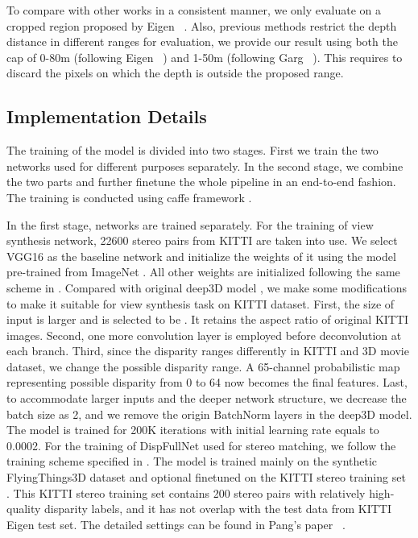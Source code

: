 \documentclass[10pt,twocolumn,letterpaper]{article}
\begin{document}
To compare with other works in a consistent manner, we only evaluate on a cropped region proposed by Eigen \etal~\cite{eigen2014depth}. Also, previous methods restrict the depth distance in different ranges for evaluation, we provide our result using both the cap of 0-80m (following Eigen \etal~\cite{eigen2014depth}) and 1-50m (following Garg \etal~\cite{garg2016unsupervised}). This requires to discard the pixels on which the depth is outside the proposed range. 

\subsection{Implementation Details}
\label{secion:impl_details}
The training of the model is divided into two stages. First we train the two networks used for different purposes separately. In the second stage, we combine the two parts and further finetune the whole pipeline in an end-to-end fashion. The training is conducted using caffe framework \cite{jia14caffe}.

In the first stage, networks are trained separately. For the training of view synthesis network, 22600 stereo pairs from KITTI are taken into use. We select VGG16 as the baseline network and initialize the weights of it using the model pre-trained from ImageNet \cite{Simonyan14c}. All other weights are initialized following the same scheme in \cite{xie2016deep3d}. Compared with original deep3D model \cite{xie2016deep3d}, we make some modifications to make it suitable for view synthesis task on KITTI dataset. First, the size of input is larger and is selected to be . It retains the aspect ratio of original KITTI images. Second, one more convolution layer is employed before deconvolution at each branch. Third, since the disparity ranges differently in KITTI and 3D movie dataset, we change the possible disparity range. A 65-channel probabilistic map representing possible disparity from 0 to 64 now becomes the final features. Last, to accommodate larger inputs and the deeper network structure, we decrease the batch size as 2, and we remove the origin BatchNorm layers in the deep3D model. The model is trained for 200K iterations with initial learning rate equals to 0.0002. For the training of DispFullNet used for stereo matching, we follow the training scheme specified in \cite{pang2017cascade}. The model is trained mainly on the synthetic FlyingThings3D dataset \cite{mayer2016disp} and optional finetuned on the KITTI stereo training set \cite{Menze2015CVPR}. This KITTI stereo training set contains 200 stereo pairs with relatively high-quality disparity labels, and it has not overlap with the test data from KITTI Eigen test set. The detailed settings can be found in Pang's paper \etal~\cite{pang2017cascade}.
\end{document}
